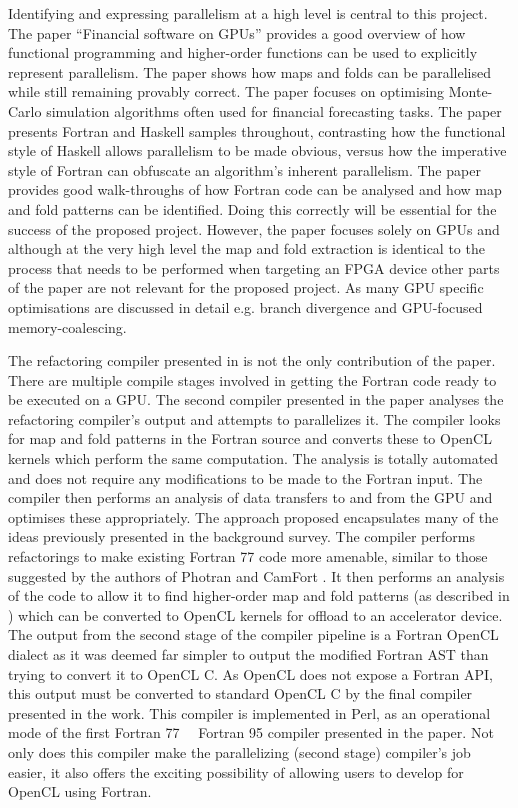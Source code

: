 \documentclass{mpaper}
\begin{document}
Identifying and expressing parallelism at a high level is central to this project. The paper ``Financial software on GPUs'' \cite{Oancea2012} provides a good overview of how functional programming and higher-order functions can be used to explicitly represent parallelism. The paper shows how maps and folds can be parallelised while still remaining provably correct. The paper focuses on optimising Monte-Carlo simulation algorithms often used for financial forecasting tasks. The paper presents Fortran and Haskell samples throughout, contrasting how the functional style of Haskell allows parallelism to be made obvious, versus how the imperative style of Fortran can obfuscate an algorithm's inherent parallelism. The paper provides good walk-throughs of how Fortran code can be analysed and how map and fold patterns can be identified. Doing this correctly will be essential for the success of the proposed project. However, the paper focuses solely on GPUs and although at the very high level the map and fold extraction is identical to the process that needs to be performed when targeting an FPGA device other parts of the paper are not relevant for the proposed project. As many GPU specific optimisations are discussed in detail e.g. branch divergence and GPU-focused memory-coalescing. 

The refactoring compiler presented in \cite{VanderbauwhedeDavidson2018} is not the only contribution of the paper. There are multiple compile stages involved in getting the Fortran code ready to be executed on a GPU. The second compiler presented in the paper analyses the refactoring compiler's output and attempts to parallelizes it. The compiler looks for map and fold patterns in the Fortran source and converts these to OpenCL kernels which perform the same computation. The analysis is totally automated and does not require any modifications to be made to the Fortran input. The compiler then performs an analysis of data transfers to and from the GPU and optimises these appropriately. The approach proposed encapsulates many of the ideas previously presented in the background survey. The compiler performs refactorings to make existing Fortran 77 code more amenable, similar to those suggested by the authors of Photran \cite{Overbey2005} and CamFort \cite{Orchard2013}. It then performs  an analysis of the code to allow it to find higher-order map and fold patterns (as described in \cite{Oancea2012}) which can be converted to OpenCL kernels for offload to an accelerator device. The output from the second stage of the compiler pipeline is a Fortran OpenCL dialect as it was deemed far simpler to output the modified Fortran AST than trying to convert it to OpenCL C.  As OpenCL does not expose a Fortran API, this output must be converted to standard OpenCL C by the final compiler presented in the work. This compiler is implemented in Perl, as an operational mode of the first Fortran 77 \textrightarrow \ \ Fortran 95 compiler presented in the paper. Not only does this compiler make the parallelizing (second stage) compiler's job easier, it also offers the exciting possibility of allowing users to develop for OpenCL using Fortran.  
\end{document}
